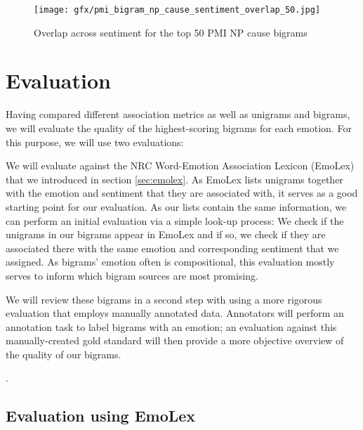 \begin{figure}[bth]
\texttt{[image: gfx/pmi\_bigram\_np\_cause\_sentiment\_overlap\_50.jpg]}
\caption{Overlap across sentiment for the top 50 PMI NP cause bigrams}\label{fig:pmi-bigram-np-cause-sentiment-overlap-50}
\end{figure}

\section{Evaluation} \label{sec:evaluation}

Having compared different association metrics as well as unigrams and bigrams, we will evaluate the quality of the highest-scoring bigrams for each emotion. For this purpose, we will use two evaluations:

\begin{aenumerate}
	\item We will evaluate against the NRC Word-Emotion Association Lexicon (EmoLex) \cite{nrc_emolex} that we introduced in section \ref{sec:emolex}. As EmoLex lists unigrams together with the emotion and sentiment that they are associated with, it serves as a good starting point for our evaluation. As our lists contain the same information, we can perform an initial evaluation via a simple look-up process: We check if the unigrams in our bigrams appear in EmoLex and if so, we check if they are associated there with the same emotion and corresponding sentiment that we assigned. As bigrams' emotion often is compositional, this evaluation mostly serves to inform which bigram sources are most promising.
	\item We will review these bigrams in a second step with using a more rigorous evaluation that employs manually annotated data. Annotators will perform an annotation task to label bigrams with an emotion; an evaluation against this manually-created gold standard will then provide a more objective overview of the quality of our bigrams.
\end{aenumerate}.

\subsection{Evaluation using EmoLex} \label{sec:emolex-evaluation}

